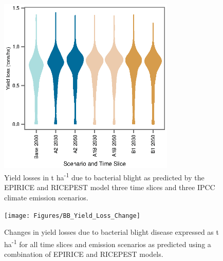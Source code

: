     \begin{figure}
      \includegraphics[width = 84mm]{Figures/BB_Losses_Violin}
      \caption{Yield losses in t ha\textsuperscript{-1} due to bacterial blight as predicted by the EPIRICE and RICEPEST model three time slices and three IPCC climate emission scenarios.}
      \label{BB_Losses_Violin}
    \end{figure}
    
    
    \begin{figure}
      \texttt{[image: Figures/BB\_Yield\_Loss\_Change]}
      \caption{Changes in yield losses due to bacterial blight disease expressed as t ha\textsuperscript{-1} for all time slices and emission scenarios as predicted using a combination of EPIRICE and RICEPEST models.}
      \label{BB_Change_Map}
    \end{figure}





